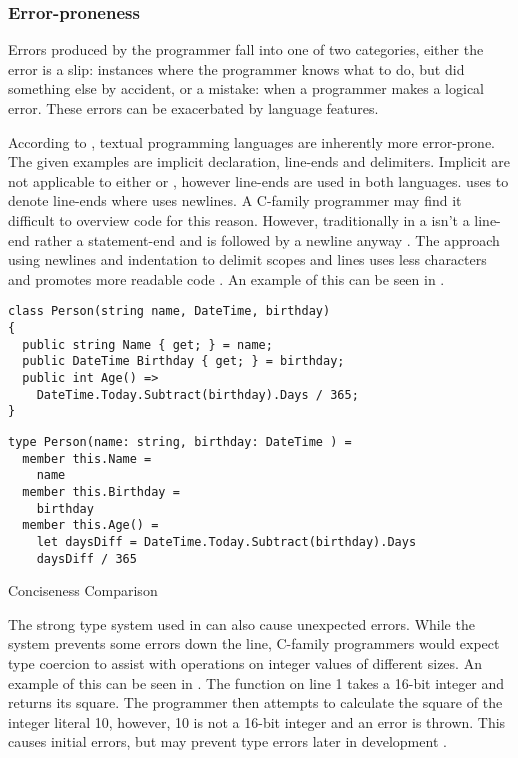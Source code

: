 \subsubsection{Error-proneness}
Errors produced by the programmer fall into one of two categories, either the error is a slip: instances where the programmer knows what to do, but did something else by accident, or a mistake: when a programmer makes a logical error. These errors can be exacerbated by language features.

According to \cite{green1996usability}, textual programming languages are inherently more error-prone. The given examples are implicit declaration, line-ends and delimiters. Implicit are not applicable to either \cs or \fs, however line-ends are used in both languages. \cs uses \m{;} to denote line-ends where \fs uses newlines. A C-family programmer may find it difficult to overview \fs code for this reason. However, traditionally in \cs a \m{;} isn't a line-end rather a statement-end and is followed by a newline anyway \needcite. The \fs approach using newlines and indentation to delimit scopes and lines uses less characters and promotes more readable code \needcite. An example of this can be seen in .

\begin{listing}[H]
\begin{verbatim}
class Person(string name, DateTime, birthday)
{
  public string Name { get; } = name;
  public DateTime Birthday { get; } = birthday;
  public int Age() =>
    DateTime.Today.Subtract(birthday).Days / 365;
}
\end{verbatim}
\begin{verbatim}
type Person(name: string, birthday: DateTime ) =
  member this.Name =
    name
  member this.Birthday =
    birthday
  member this.Age() =
    let daysDiff = DateTime.Today.Subtract(birthday).Days
    daysDiff / 365
\end{verbatim}
\caption{Conciseness Comparison \cite{wlaschin2017FsharpForCsharpProgrammers}}
\label{lst:con-comp}
\end{listing}

The strong type system used in \fs can also cause unexpected errors. While the system prevents some errors down the line, C-family programmers would expect type coercion to assist with operations on integer values of different sizes. An example of this can be seen in . The function on line 1 takes a 16-bit integer and returns its square. The programmer then attempts to calculate the square of the integer literal 10, however, 10 is not a 16-bit integer and an error is thrown. This causes initial errors, but may prevent type errors later in development \needcite.

